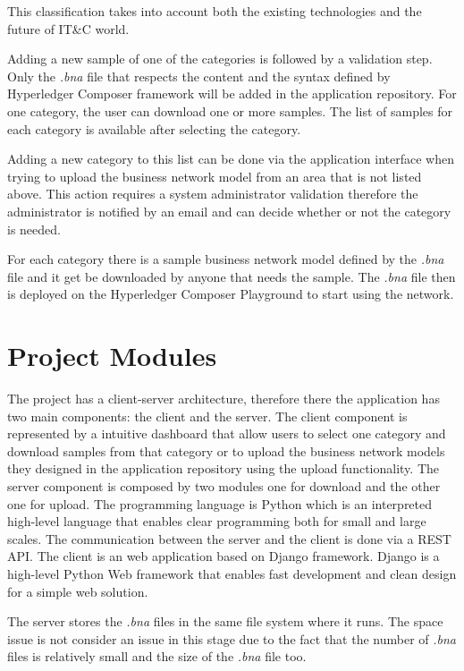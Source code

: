 This classification takes into account both the existing technologies and the future of IT\&C world.

Adding a new sample of one of the categories is followed by a validation step. Only the \emph{.bna} file that respects the content and the syntax defined by Hyperledger Composer framework will be added in the application repository.
For one category, the user can download one or more samples. The list of samples for each category is available after selecting the category.

Adding a new category to this list can be done via the application interface when trying to upload the business network model from an area that is not listed above. This action requires a system administrator validation therefore the administrator is notified by an email and can decide whether or not the category is needed.

For each category there is a sample business network model defined by the \emph{.bna} file and it get be downloaded by anyone that needs the sample.
The \emph{.bna} file then is deployed on the Hyperledger Composer Playground to start using the network.

\section{Project Modules}
\label{sub-sec:chapter3-section2}
The project has a client-server architecture, therefore there the application has two main components: the client and the server.
The client component is represented by a intuitive dashboard that allow users to select one category and download samples from that category or to upload the business network models they designed in the application repository using the upload functionality.
The server component is composed by two modules one for download and the other one for upload. The programming language is Python which is an interpreted high-level language that enables clear programming both for small and large scales.
The communication between the server and the client is done via a REST API.
The client is an web application based on Django framework. 
Django is a high-level Python Web framework that enables fast development and clean design for a simple web solution.

The server stores the \emph{.bna} files in the same file system where it runs. The space issue is not consider an issue in this stage due to the fact that the number of \emph{.bna} files is relatively small and the size of the \emph{.bna} file too.

